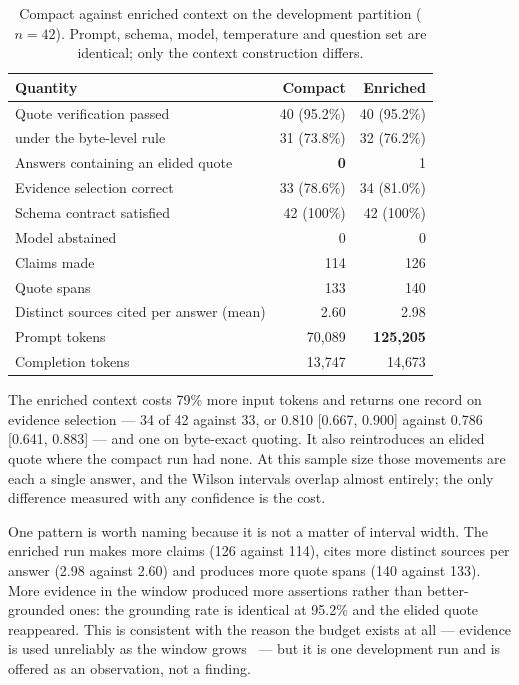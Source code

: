 \begin{table}[htbp]
  \centering
  \caption{Compact against enriched context on the development partition ($n = 42$). Prompt, schema, model, temperature and question set are identical; only the context construction differs.}
  \label{tab:context-variants}
  \small
  \begin{tabular}{lrr}
    \toprule
    \textbf{Quantity} & \textbf{Compact} & \textbf{Enriched} \\
    \midrule
    Quote verification passed & 40 (95.2\%) & 40 (95.2\%) \\
    \quad under the byte-level rule & 31 (73.8\%) & 32 (76.2\%) \\
    Answers containing an elided quote & \textbf{0} & 1 \\
    Evidence selection correct & 33 (78.6\%) & 34 (81.0\%) \\
    Schema contract satisfied & 42 (100\%) & 42 (100\%) \\
    Model abstained & 0 & 0 \\
    \midrule
    Claims made & 114 & 126 \\
    Quote spans & 133 & 140 \\
    Distinct sources cited per answer (mean) & 2.60 & 2.98 \\
    \midrule
    Prompt tokens & 70{,}089 & \textbf{125{,}205} \\
    Completion tokens & 13{,}747 & 14{,}673 \\
    \bottomrule
  \end{tabular}
\end{table}

The enriched context costs 79\% more input tokens and returns one record on
evidence selection --- 34 of 42 against 33, or 0.810 [0.667, 0.900] against 0.786
[0.641, 0.883] --- and one on byte-exact quoting. It also reintroduces an elided
quote where the compact run had none. At this sample size those movements are
each a single answer, and the Wilson intervals overlap almost entirely; the only
difference measured with any confidence is the cost.

One pattern is worth naming because it is not a matter of interval width. The
enriched run makes more claims (126 against 114), cites more distinct sources per
answer (2.98 against 2.60) and produces more quote spans (140 against 133). More
evidence in the window produced more assertions rather than better-grounded ones:
the grounding rate is identical at 95.2\% and the elided quote reappeared. This is
consistent with the reason the budget exists at all --- evidence is used
unreliably as the window grows~\cite{liu2024lostmiddle} --- but it is one
development run and is offered as an observation, not a finding.

